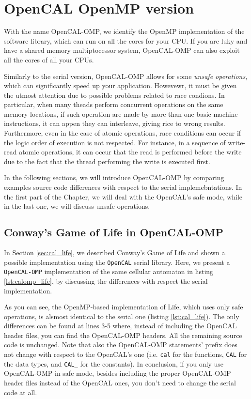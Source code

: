 \chapter{OpenCAL OpenMP version}\label{ch:opencal-omp}

With the name OpenCAL-OMP, we identify the OpenMP implementation of
the software library, which can run on all the cores for your CPU. If
you are luky and have a shared memory multiptocessor system,
OpenCAL-OMP can also exploit all the cores of all your CPUs.

Similarly to the serial version, OpenCAL-OMP allows for some
\emph{unsafe operations}, which can significantly speed up your
application. Howevewr, it must be given the utmost attention due to
possible problems related to race condions. In particular, when many
theads perform concurrent operations on the same memory locations, if
such operation are made by more than one basic machine instructions,
it can appen they can interleave, giving rice to wrong
results. Furthermore, even in the case of atomic operations, race
conditions can occur if the logic order of execution is not
respected. For instance, in a sequence of write-read atomic
operations, it can occur that the read is performed before the write
due to the fact that the thread performing the write is executed
first.

In the following sections, we will introduce OpenCAL-OMP by comparing
examples source code differences with respect to the serial
implemebntations. In the first part of the Chapter, we will deal with
the OpenCAL's safe mode, while in the last one, we will discuss unsafe
operations.

\section{Conway's Game of Life in OpenCAL-OMP}

In Section \ref{sec:cal_life}, we described Conway's Game of Life and
shown a possible implementation using the \verb'OpenCAL' serial
library. Here, we present a \verb'OpenCAL-OMP' implementation of the
same cellular automaton in listing \ref{lst:calomp_life}, by
discussing the differences with respect the serial implementation.



As you can see, the OpenMP-based implementation of Life, which uses
only safe operations, is alsmost identical to the serial one (listing
\ref{lst:cal_life}). The only differences can be found at lines 3-5
where, instead of including the OpenCAL header files, you can find the
OpenCAL-OMP headers. All the remaining source code is unchanged. Note
that also the OpenCAL-OMP statements' prefix does not change with
respect to the OpenCAL's one (i.e. \verb'cal' for the functions,
\verb'CAL' for the data types, and \verb'CAL_' for the constants). In
conclusion, if you only use OpenCAL-OMP in safe mode, besides
including the proper OpenCAL-OMP header files instead of the OpenCAL
ones, you don't need to change the serial code at all.

